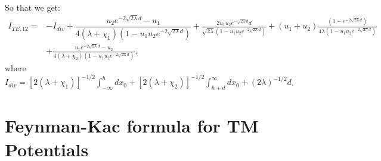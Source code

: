 \begin{itemize}

So that we get:
\begin{align}
I_{TE,12} =& -I_{div} + \dfrac{u_2 e^{-2\sqrt{2\lambda}d}-u_1}{4(\lambda+\chi_1)(1-u_1u_2 e^{-2\sqrt{2\lambda}d})} +\frac{2u_1u_2 e^{-\sqrt{2\lambda}d}d}{\sqrt{2\lambda}(1-u_1u_2 e^{-2\sqrt{2\lambda}d})} + (u_1+u_2)\frac{(1-e^{-2\sqrt{2\lambda}d})}{4\lambda(1-u_1u_2e^{-2\sqrt{2\lambda}d})}\nonumber\\
& +\frac{u_1 e^{-2\sqrt{2\lambda}d} - u_2}{4(\lambda+\chi_2)(1-u_1u_2 e^{-2\sqrt{2\lambda}d})},
\end{align}
where $I_{div} = [2(\lambda+\chi_1)]^{-1/2}\int_{-\infty}^h dx_0  +  [2(\lambda+\chi_2)]^{-1/2}\int_{h+d}^\infty dx_0  + (2\lambda)^{-1/2}d$.
 

\end{itemize}

\section{Feynman-Kac formula for TM Potentials}

